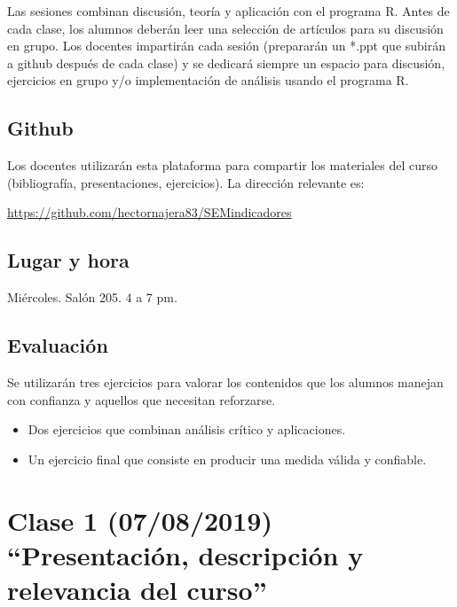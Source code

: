 \documentclass[11pt,]{article}
\begin{document}
Las sesiones combinan discusión, teoría y aplicación con el programa R.
Antes de cada clase, los alumnos deberán leer una selección de artículos
para su discusión en grupo. Los docentes impartirán cada sesión
(prepararán un *.ppt que subirán a github después de cada clase) y se
dedicará siempre un espacio para discusión, ejercicios en grupo y/o
implementación de análisis usando el programa R.

\hypertarget{github}{%
\subsection{Github}\label{github}}

Los docentes utilizarán esta plataforma para compartir los materiales
del curso (bibliografía, presentaciones, ejercicios). La dirección
relevante es:

\url{https://github.com/hectornajera83/SEMindicadores}

\hypertarget{lugar-y-hora}{%
\subsection{Lugar y hora}\label{lugar-y-hora}}

Miércoles. Salón 205. 4 a 7 pm.

\hypertarget{evaluacion}{%
\subsection{Evaluación}\label{evaluacion}}

Se utilizarán tres ejercicios para valorar los contenidos que los
alumnos manejan con confianza y aquellos que necesitan reforzarse.

\begin{itemize}
\item
  Dos ejercicios que combinan análisis crítico y aplicaciones.
\item
  Un ejercicio final que consiste en producir una medida válida y
  confiable.
\end{itemize}

\newpage

\hypertarget{clase-1-07082019-presentacion-descripcion-y-relevancia-del-curso}{%
\section{Clase 1 (07/08/2019) ``Presentación, descripción y relevancia
del
curso''}\label{clase-1-07082019-presentacion-descripcion-y-relevancia-del-curso}}
\end{document}

